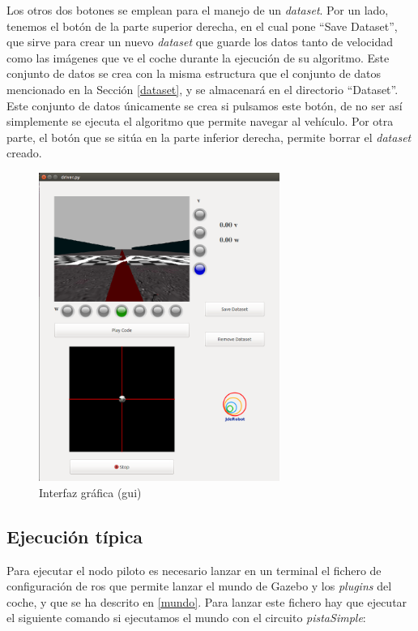 Los otros dos botones se emplean para el manejo de un \textit{dataset}. Por un lado, tenemos el botón de la parte superior derecha, en el cual pone ``Save Dataset'', que sirve para crear un nuevo \textit{dataset} que guarde los datos tanto de velocidad como las imágenes que ve el coche durante la ejecución de su algoritmo. Este conjunto de datos se crea con la misma estructura que el conjunto de datos mencionado en la Sección \ref{dataset}, y se almacenará en el directorio ``Dataset''. Este conjunto de datos únicamente se crea si pulsamos este botón, de no ser así simplemente se ejecuta el algoritmo que permite navegar al vehículo. Por otra parte, el botón que se sitúa en la parte inferior derecha, permite borrar el \textit{dataset} creado.\\

\begin{figure}[H]
  \begin{center}
    \includegraphics[width=0.7\textwidth]{figures/Infraestructura/gui.png}
		\caption{Interfaz gráfica (\acrshort{gui})}
		\label{fig.gui}
		\end{center}
\end{figure}


\subsection{Ejecución típica}

Para ejecutar el nodo piloto es necesario lanzar en un terminal el fichero de configuración de \acrshort{ros} que permite lanzar el mundo de Gazebo y los \textit{plugins} del coche, y que se ha descrito en \ref{mundo}. Para lanzar este fichero hay que ejecutar el siguiente comando si ejecutamos el mundo con el circuito \textit{pistaSimple}:\\

